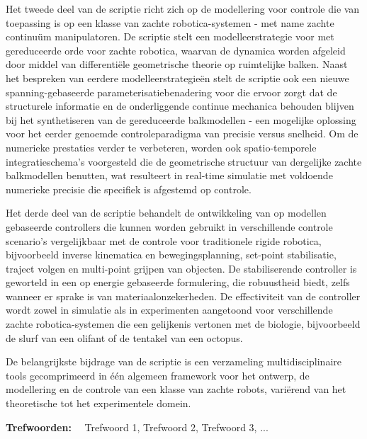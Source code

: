 Het tweede deel van de scriptie richt zich op de modellering voor controle die van toepassing is op een klasse van zachte robotica-systemen - met name zachte continuüm manipulatoren. De scriptie stelt een modelleerstrategie voor met gereduceerde orde voor zachte robotica, waarvan de dynamica worden afgeleid door middel van differentiële geometrische theorie op ruimtelijke balken. Naast het bespreken van eerdere modelleerstrategieën stelt de scriptie ook een nieuwe spanning-gebaseerde parameterisatiebenadering voor die ervoor zorgt dat de structurele informatie en de onderliggende continue mechanica behouden blijven bij het synthetiseren van de gereduceerde balkmodellen - een mogelijke oplossing voor het eerder genoemde controleparadigma van precisie versus snelheid. Om de numerieke prestaties verder te verbeteren, worden ook spatio-temporele integratieschema's voorgesteld die de geometrische structuur van dergelijke zachte balkmodellen benutten, wat resulteert in real-time simulatie met voldoende numerieke precisie die specifiek is afgestemd op controle.

Het derde deel van de scriptie behandelt de ontwikkeling van op modellen gebaseerde controllers die kunnen worden gebruikt in verschillende controle scenario's vergelijkbaar met de controle voor traditionele rigide robotica, bijvoorbeeld inverse kinematica en bewegingsplanning, set-point stabilisatie, traject volgen en multi-point grijpen van objecten. De stabiliserende controller is geworteld in een op energie gebaseerde formulering, die robuustheid biedt, zelfs wanneer er sprake is van materiaalonzekerheden. De effectiviteit van de controller wordt zowel in simulatie als in experimenten aangetoond voor verschillende zachte robotica-systemen die een gelijkenis vertonen met de biologie, bijvoorbeeld de slurf van een olifant of de tentakel van een octopus.

De belangrijkste bijdrage van de scriptie is een verzameling multidisciplinaire tools gecomprimeerd in één algemeen framework voor het ontwerp, de modellering en de controle van een klasse van zachte robots, variërend van het theoretische tot het experimentele domein.

\vspace*{11pt}\noindent
\textbf{Trefwoorden:} \ \ Trefwoord 1, Trefwoord 2, Trefwoord 3, ...

